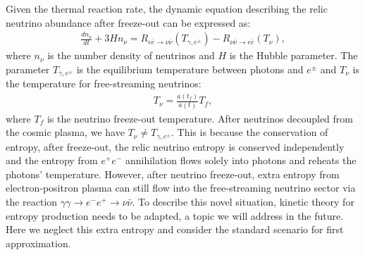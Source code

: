 Given the thermal reaction rate, the dynamic equation describing the relic neutrino abundance after freeze-out can be expressed as:
\begin{align}\label{ExtraNeutrio_eq}
\frac{dn_\nu}{dt}+3Hn_\nu=R_{e\overline{e}\to\nu\overline{\nu}}(T_{\gamma,e^\pm})-R_{\nu\overline{\nu}\to e\overline{e}}(T_\nu),
\end{align}
where $n_\nu$ is the number density of neutrinos and $H$ is the Hubble parameter. The parameter $T_{\gamma,e^\pm}$ is the equilibrium temperature between photons and $e^\pm$ and $T_\nu$ is the temperature for free-streaming neutrinos: 
\begin{align}
T_\nu=\frac{a(t_f)}{a(t)}T_f,
\end{align}
where $T_f$ is the neutrino freeze-out temperature. After neutrinos decoupled from the cosmic plasma, we have $T_\nu\neq T_{\gamma,e^\pm}$. This is because
the conservation of entropy, after freeze-out, the relic neutrino entropy is conserved independently and the entropy from $e^+e^-$ annihilation flows solely into photons and reheats the photons' temperature. However, after neutrino freeze-out, extra entropy from electron-positron plasma can still flow into the free-streaming neutrino sector via the reaction $\gamma\gamma\to e^-e^+\to\nu\bar{\nu}$. To describe this novel situation, kinetic theory for entropy production needs to be adapted, a topic we will address in the future. Here we neglect this extra entropy and consider the standard scenario for first approximation.


